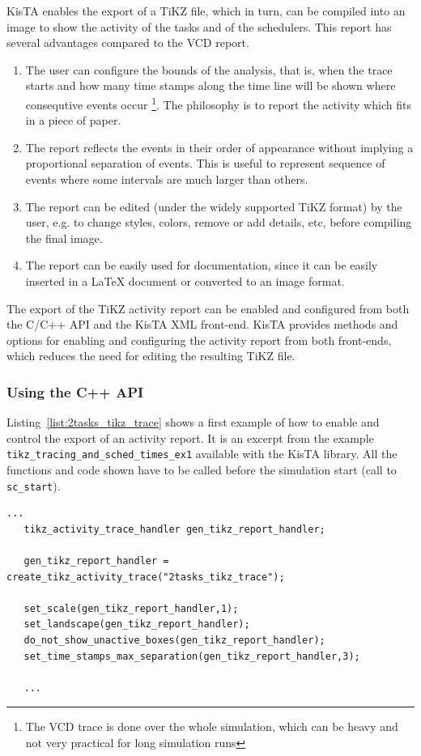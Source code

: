 KisTA enables the export of a TiKZ file, which in turn, can be compiled into an image
to show the activity of the tasks and of the schedulers.
%
This report has several advantages compared to the VCD report.
\begin{enumerate}
\item The user can configure the bounds of the analysis, that is, when the trace starts and how many
time stamps along the time line will be shown where consequtive events occur 
\footnote{
The VCD trace is done over the whole simulation, which can be heavy and not very practical for long simulation runs}.
The philosophy is to report the activity which fits in a piece of paper.
\item The report reflects the events in their order of appearance without implying a proportional separation of events.
This is useful to represent sequence of events where some intervals are much larger than others.
\item The report can be edited (under the widely supported TiKZ format) by the user, e.g. to change styles, colors, remove or add details, etc,
 before compiling the final image.
\item The report can be easily used for documentation, since it can be easily inserted in a LaTeX document or converted to an image format.
\end{enumerate}

%
The export of the TiKZ activity report can be enabled and configured from both
the C/C++ API and the KisTA XML front-end.
%
KisTA provides methods and options for enabling and configuring the activity report
from both front-ends, which reduces the need for editing the resulting TiKZ file.

\subsubsection{Using the C++ API}
\label{sec:activity_c_api}

Listing~\ref{list:2tasks_tikz_trace} shows a first example of how to enable and control the export of an activity report.
It is an excerpt from the example \texttt{tikz\_tracing\_and\_sched\_times\_ex1} available with the KisTA library.
All the functions and code shown have to be called before the simulation start (call to \texttt{sc\_start}).
\begin{table}[htbp]
\begin{lstlisting}[style=KistaCodeStyle,caption={API for controling tracing tasks and scheduler activity.},label=list:2tasks_tikz_trace]
   ...
   tikz_activity_trace_handler gen_tikz_report_handler;

   gen_tikz_report_handler = create_tikz_activity_trace("2tasks_tikz_trace");
   
   set_scale(gen_tikz_report_handler,1);
   set_landscape(gen_tikz_report_handler);
   do_not_show_unactive_boxes(gen_tikz_report_handler);
   set_time_stamps_max_separation(gen_tikz_report_handler,3);

   ...

\end{lstlisting}
\end{table}

